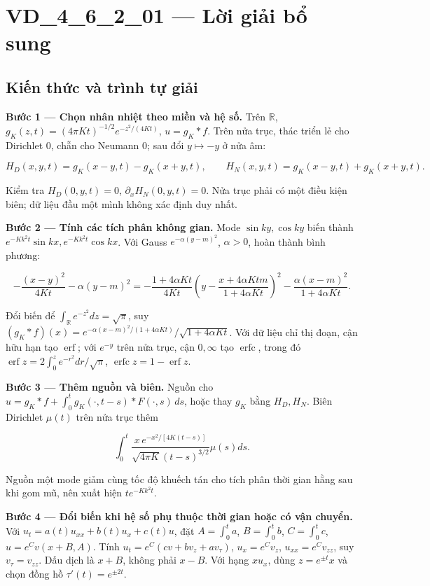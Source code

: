 \documentclass[10pt,a4paper]{article}
\begin{document}
\section*{VD\_4\_6\_2\_01 — Lời giải bổ sung}
\subsection*{Kiến thức và trình tự giải}
\textbf{Bước 1 — Chọn nhân nhiệt theo miền và hệ số.} Trên $\mathbb R$, $g_K(z,t)=(4\pi Kt)^{-1/2}e^{-z^2/(4Kt)}$, $u=g_K*f$. Trên nửa trục, thác triển lẻ cho Dirichlet $0$, chẵn cho Neumann $0$; sau đổi $y\mapsto-y$ ở nửa âm:


\[
H_D(x,y,t)=g_K(x-y,t)-g_K(x+y,t),\qquad
H_N(x,y,t)=g_K(x-y,t)+g_K(x+y,t).
\]


Kiểm tra $H_D(0,y,t)=0$, $\partial_xH_N(0,y,t)=0$. Nửa trục phải có một điều kiện biên; dữ liệu đầu một mình không xác định duy nhất.

\textbf{Bước 2 — Tính các tích phân không gian.} Mode $\sin ky,\cos ky$ biến thành $e^{-Kk^2t}\sin kx,e^{-Kk^2t}\cos kx$. Với Gauss $e^{-\alpha(y-m)^2}$, $\alpha>0$, hoàn thành bình phương:


\[
-\frac{(x-y)^2}{4Kt}-\alpha(y-m)^2
=-\frac{1+4\alpha Kt}{4Kt}\left(y-\frac{x+4\alpha Ktm}{1+4\alpha Kt}\right)^2
-\frac{\alpha(x-m)^2}{1+4\alpha Kt}.
\]


Đổi biến để $\int_{\mathbb R}e^{-z^2}dz=\sqrt\pi$, suy $(g_K*f)(x)=e^{-\alpha(x-m)^2/(1+4\alpha Kt)}/\sqrt{1+4\alpha Kt}$. Với dữ liệu chỉ thị đoạn, cận hữu hạn tạo $\operatorname{erf}$; với $e^{-y}$ trên nửa trục, cận $0,\infty$ tạo $\operatorname{erfc}$, trong đó $\operatorname{erf}z=2\int_0^ze^{-r^2}dr/\sqrt\pi$, $\operatorname{erfc}z=1-\operatorname{erf}z$.

\textbf{Bước 3 — Thêm nguồn và biên.} Nguồn cho $u=g_K*f+\int_0^tg_K(\cdot,t-s)*F(\cdot,s)\,ds$, hoặc thay $g_K$ bằng $H_D,H_N$. Biên Dirichlet $\mu(t)$ trên nửa trục thêm


\[
\int_0^t\frac{x\,e^{-x^2/[4K(t-s)]}}{\sqrt{4\pi K}(t-s)^{3/2}}\mu(s)ds.
\]


Nguồn một mode giảm cùng tốc độ khuếch tán cho tích phân thời gian hằng sau khi gom mũ, nên xuất hiện $te^{-Kk^2t}$.

\textbf{Bước 4 — Đổi biến khi hệ số phụ thuộc thời gian hoặc có vận chuyển.} Với $u_t=a(t)u_{xx}+b(t)u_x+c(t)u$, đặt $A=\int_0^ta$, $B=\int_0^tb$, $C=\int_0^tc$, $u=e^Cv(x+B,A)$. Tính $u_t=e^C(cv+bv_z+av_\tau)$, $u_x=e^Cv_z$, $u_{xx}=e^Cv_{zz}$, suy $v_\tau=v_{zz}$. Dấu dịch là $x+B$, không phải $x-B$. Với hạng $xu_x$, dùng $z=e^{\pm t}x$ và chọn đồng hồ $\tau'(t)=e^{\pm2t}$.
\end{document}
